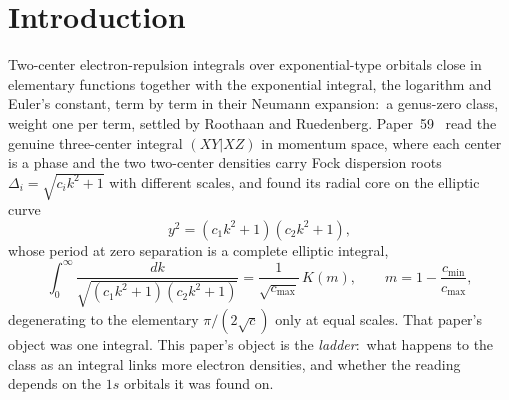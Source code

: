 \documentclass[aps,pra,twocolumn,superscriptaddress,longbibliography]{revtex4-2}
\begin{document}
\maketitle

\section{Introduction}
\label{sec:intro}

Two-center electron-repulsion integrals over exponential-type orbitals close
in elementary functions together with the exponential integral, the
logarithm and Euler's constant, term by term in their Neumann expansion:\ a
genus-zero class, weight one per term, settled by Roothaan and Ruedenberg.  Paper~59~\cite{loutey_paper59} read the genuine
three-center integral $(XY|XZ)$ in momentum space, where each center is a
phase and the two two-center densities carry Fock dispersion roots
$\Delta_i=\sqrt{c_ik^2+1}$ with different scales, and found its radial core
on the elliptic curve
%
\begin{equation}
  y^{2} = (c_{1}k^{2}+1)(c_{2}k^{2}+1),
  \label{eq:curve}
\end{equation}
%
whose period at zero separation is a complete elliptic integral,
%
\begin{equation}
  \int_{0}^{\infty}\!\frac{dk}{\sqrt{(c_{1}k^{2}+1)(c_{2}k^{2}+1)}}
  = \frac{1}{\sqrt{c_{\max}}}\,K(m),\qquad m=1-\frac{c_{\min}}{c_{\max}},
  \label{eq:period}
\end{equation}
%
degenerating to the elementary $\pi/(2\sqrt c)$ only at equal scales.  That
paper's object was one integral.  This paper's object is the \emph{ladder}:\
what happens to the class as an integral links more electron densities, and
whether the reading depends on the $1s$ orbitals it was found on.
\end{document}
